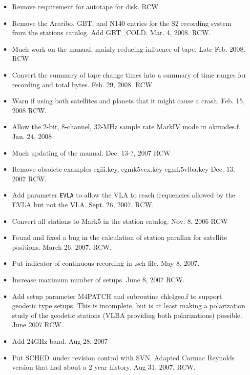 \documentclass{report}
\newcommand{\schedb}{{\sc SCHED~}}
\begin{document}
\begin{itemize}
\item  Remove requirement for autotape for disk. RCW

\item  Remove the Arecibo, GBT, and N140 entries for the S2 recording
       system from the stations catalog.  Add GBT\_COLD.  Mar. 4, 2008. RCW.

\item  Much work on the manual, mainly reducing influence of tape.
       Late Feb. 2008.  RCW

\item  Convert the summary of tape change times into a summary of
       time ranges for recording and total bytes.  Feb. 29, 2008. RCW

\item  Warn if using both satellites and planets that it might cause
       a crash.  Feb. 15, 2008  RCW.

\item  Allow the 2-bit, 8-channel, 32-MHz sample rate MarkIV mode in
       okmodes.f.  Jan. 24, 2008

\item  Much updating of the manual.  Dec. 13-?, 2007  RCW

\item  Remove obsolete examples egiii.key, egmk5vex.key egmk5vlba.key
       Dec. 13, 2007  RCW.

\item  Add parameter {\tt EVLA} to allow the VLA to reach frequencies allowed
       by the EVLA but not the VLA.  Sept. 26, 2007.  RCW.

\item  Convert all stations to Mark5 in the station catalog.  Nov. 8, 2006 RCW

\item  Found and fixed a bug in the calculation of station parallax for
satellite positions.  March 26, 2007. RCW.

\item  Put indicator of continuous recording in .sch file.  May 8, 2007.

\item  Increase maximum number of setups.  June 8, 2007  RCW.

\item  Add setup parameter M4PATCH and subroutine chk4geo.f to support
geodetic type setups.  This is incomplete, but is at least making a
polarization study of the geodetic stations (VLBA providing both polarizations)
possible.  June 2007  RCW.

\item  Add 24GHz band.  Aug 28, 2007

\item  Put \schedb under revision control with SVN.  Adapted Cormac Reynolds
version that had about a 2 year history.  Aug 31, 2007.  RCW.


\end{itemize}
\end{document}

